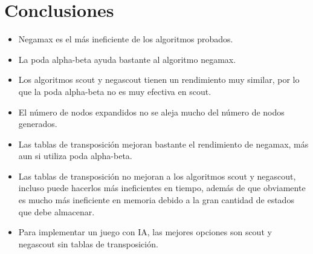 \documentclass[a4paper,10pt]{article}
\begin{document}
\section*{Conclusiones}
  \begin{itemize}
    \item Negamax es el m\'as ineficiente de los algoritmos probados.
    \item La poda alpha-beta ayuda bastante al algoritmo negamax.
    \item Los algoritmos scout y negascout tienen un rendimiento muy similar, por lo que la poda 
    alpha-beta no es muy efectiva en scout.
    \item El n\'umero de nodos expandidos no se aleja mucho del n\'umero de nodos generados.
    \item Las tablas de transposici\'on mejoran bastante el rendimiento de negamax, m\'as aun si 
    utiliza poda alpha-beta.
    \item Las tablas de transposici\'on no mejoran a los algoritmos scout y negascout, incluso 
    puede hacerlos m\'as ineficientes en tiempo, adem\'as de que obviamente es mucho m\'as ineficiente 
    en memoria debido a la gran cantidad de estados que debe almacenar.
    \item Para implementar un juego con IA, las mejores opciones son scout y negascout sin tablas 
    de transposici\'on.
  \end{itemize}
\end{document}
